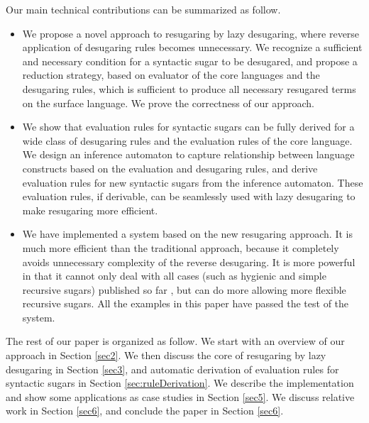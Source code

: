 Our main technical contributions can be summarized as follow.
\begin{itemize}
\item We propose a novel approach to resugaring by lazy desugaring, where reverse application of desugaring rules becomes unnecessary. We recognize a sufficient and necessary condition for a syntactic sugar to be desugared, and propose a reduction strategy, based on evaluator of the core languages and the desugaring rules, which is sufficient to produce all necessary resugared terms on the surface language. We prove the correctness of our approach.



\item We show that evaluation rules for syntactic sugars can be fully derived for a wide  class of desugaring rules and the evaluation rules of the core language. We design an inference automaton to capture relationship between language constructs based on   the evaluation and desugaring rules, and derive evaluation rules for new syntactic sugars from the inference automaton. These evaluation rules, if derivable, can be seamlessly used with lazy desugaring to make resugaring more efficient.



\item We have implemented a system based on the new resugaring approach. It is much more efficient than the traditional approach, because it completely avoids unnecessary complexity of the reverse desugaring. It is more powerful in that it cannot only deal with all cases (such as hygienic and simple recursive sugars) published so far \cite{resugaring,hygienic}, but can do more allowing more flexible recursive sugars. All the examples in this paper have passed the test of the system.


\end{itemize}

The rest of our paper is organized as follow. We start with an overview of our approach in Section \ref{sec2}. We then discuss the core of resugaring by lazy desugaring in Section \ref{sec3}, and automatic derivation of evaluation rules for syntactic sugars in Section \ref{sec:ruleDerivation}. We describe the implementation and show some applications as case studies in Section \ref{sec5}. We discuss relative work in Section \ref{sec6}, and conclude the paper in Section \ref{sec6}.
